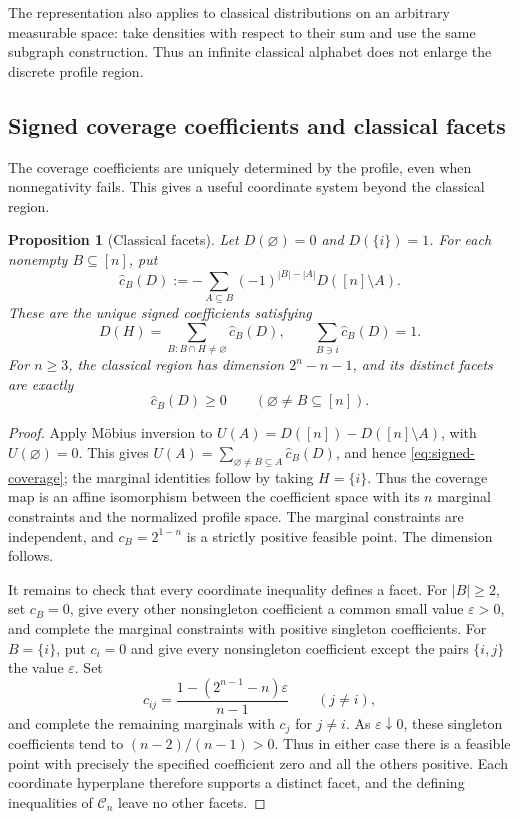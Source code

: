 \documentclass[a4paper,11pt,onecolumn,unpublished]{quantumarticle}
\newtheorem{proposition}[theorem]{Proposition}
\theoremstyle{definition}
\newcommand{\1}{\mathbf 1}
\newcommand{\Coeff}{\mathcal C}
\begin{document}
The representation also applies to classical distributions on an arbitrary
measurable space: take densities with respect to their sum and use the same
subgraph construction. Thus an infinite classical alphabet does not enlarge
the discrete profile region.


\subsection{Signed coverage coefficients and classical facets}

The coverage coefficients are uniquely determined by the profile, even when
nonnegativity fails. This gives a useful coordinate system beyond the
classical region.

\begin{proposition}[Classical facets]\label{prop:all-classical-facets}
Let $D(\varnothing)=0$ and $D(\{i\})=1$. For each nonempty $B\subseteq[n]$, put
\begin{equation}\label{eq:signed-coefficients}
 \widehat c_B(D):=-\sum_{A\subseteq B}(-1)^{|B|-|A|}D([n]\setminus A).
\end{equation}
These are the unique signed coefficients satisfying
\begin{equation}\label{eq:signed-coverage}
 D(H)=\sum_{B:B\cap H\ne\varnothing}\widehat c_B(D),\qquad
 \sum_{B\ni i}\widehat c_B(D)=1.
\end{equation}
For $n\ge3$, the classical region has dimension $2^n-n-1$, and its distinct
facets are exactly
\begin{equation}\label{eq:classical-facets-all}
 \widehat c_B(D)\ge0\qquad(\varnothing\ne B\subseteq[n]).
\end{equation}
\end{proposition}
\begin{proof}
Apply M\"obius inversion to $U(A)=D([n])-D([n]\setminus A)$, with
$U(\varnothing)=0$. This gives
$U(A)=\sum_{\varnothing\ne B\subseteq A}\widehat c_B(D)$, and hence
\eqref{eq:signed-coverage}; the marginal identities follow by taking
$H=\{i\}$. Thus the coverage map is an affine isomorphism between the
coefficient space with its $n$ marginal constraints and the normalized profile
space. The marginal constraints are independent, and $c_B=2^{1-n}$ is a
strictly positive feasible point. The dimension follows.

It remains to check that every coordinate inequality defines a facet.
For $|B|\ge2$, set $c_B=0$, give every other nonsingleton coefficient a common
small value $\varepsilon>0$, and complete the marginal constraints with
positive singleton coefficients. For $B=\{i\}$, put $c_i=0$ and give every
nonsingleton coefficient except the pairs $\{i,j\}$ the value $\varepsilon$.
Set
\[
 c_{ij}=\frac{1-(2^{n-1}-n)\varepsilon}{n-1}\qquad(j\ne i),
\]
and complete the remaining marginals with $c_j$ for $j\ne i$.
As $\varepsilon\downarrow0$, these singleton coefficients tend to
$(n-2)/(n-1)>0$. Thus in either case there is a feasible point with precisely
the specified coefficient zero and all the others positive. Each coordinate
hyperplane therefore supports a distinct facet, and the defining
inequalities of $\Coeff_n$ leave no other facets.
\end{proof}
\end{document}
